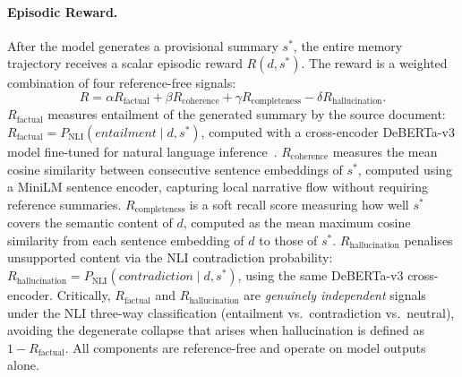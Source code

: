 \documentclass{article}
\begin{document}
\paragraph{Episodic Reward.}
After the model generates a provisional summary $s^*$, the entire memory trajectory receives a scalar episodic reward $R(d, s^*)$.
The reward is a weighted combination of four reference-free signals:
\begin{equation}
\label{eq:reward}
R =
\alpha R_{\text{factual}}
+ \beta R_{\text{coherence}}
+ \gamma R_{\text{completeness}}
- \delta R_{\text{hallucination}}.
\end{equation}
$R_{\text{factual}}$ measures entailment of the generated summary by the source document: $R_{\text{factual}} = P_{\text{NLI}}(\textit{entailment} \mid d, s^*)$, computed with a cross-encoder DeBERTa-v3 model fine-tuned for natural language inference~\citep{he2021deberta}.
$R_{\text{coherence}}$ measures the mean cosine similarity between consecutive sentence embeddings of $s^*$, computed using a MiniLM sentence encoder, capturing local narrative flow without requiring reference summaries.
$R_{\text{completeness}}$ is a soft recall score measuring how well $s^*$ covers the semantic content of $d$, computed as the mean maximum cosine similarity from each sentence embedding of $d$ to those of $s^*$.
$R_{\text{hallucination}}$ penalises unsupported content via the NLI contradiction probability: $R_{\text{hallucination}} = P_{\text{NLI}}(\textit{contradiction} \mid d, s^*)$, using the same DeBERTa-v3 cross-encoder.
Critically, $R_{\text{factual}}$ and $R_{\text{hallucination}}$ are \emph{genuinely independent} signals under the NLI three-way classification (entailment vs.\ contradiction vs.\ neutral), avoiding the degenerate collapse that arises when hallucination is defined as $1 - R_{\text{factual}}$.
All components are reference-free and operate on model outputs alone.
\end{document}
